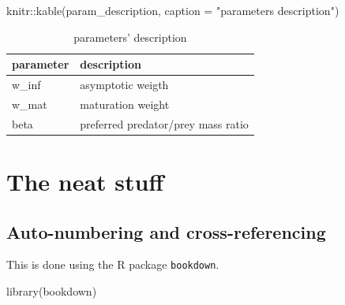 \documentclass[
  11pt,
]{article}
\newenvironment{Shaded}{\begin{snugshade}}{\end{snugshade}}
\newcommand{\AttributeTok}[1]{\textcolor[rgb]{0.77,0.63,0.00}{#1}}
\newcommand{\FunctionTok}[1]{\textcolor[rgb]{0.00,0.00,0.00}{#1}}
\newcommand{\NormalTok}[1]{#1}
\newcommand{\SpecialCharTok}[1]{\textcolor[rgb]{0.00,0.00,0.00}{#1}}
\newcommand{\StringTok}[1]{\textcolor[rgb]{0.31,0.60,0.02}{#1}}
\begin{document}
\begin{Shaded}
\begin{Highlighting}[]
\NormalTok{knitr}\SpecialCharTok{::}\FunctionTok{kable}\NormalTok{(param\_description, }\AttributeTok{caption =} \StringTok{"parameters\textquotesingle{} description"}\NormalTok{)}
\end{Highlighting}
\end{Shaded}

\begin{table}

\caption{\label{tab:params}parameters' description}
\centering
\begin{tabular}[t]{l|l}
\hline
parameter & description\\
\hline
w\_inf & asymptotic weigth\\
\hline
w\_mat & maturation weight\\
\hline
beta & preferred predator/prey mass ratio\\
\hline
\end{tabular}
\end{table}

\newpage

\hypertarget{the-neat-stuff}{%
\section{The neat stuff}\label{the-neat-stuff}}

\hypertarget{auto-numbering-and-cross-referencing}{%
\subsection{Auto-numbering and cross-referencing}\label{auto-numbering-and-cross-referencing}}

This is done using the R package \texttt{bookdown}.

\begin{Shaded}
\begin{Highlighting}[]
\FunctionTok{library}\NormalTok{(bookdown)}
\end{Highlighting}
\end{Shaded}

\begin{Shaded}
\end{Shaded}
\end{document}
